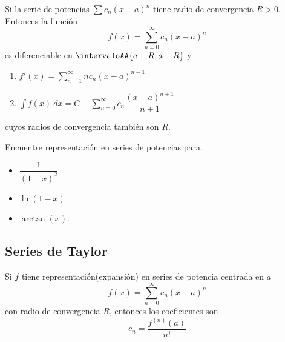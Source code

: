 \begin{frame}
  \begin{thm}
    Si la serie de potencias $\sum c_n(x-a)^n$ tiene radio de convergencia $R>0$. Entonces la función 
    $$f(x)=\sum_{n=0}^{\infty} c_n(x-a)^n$$ es diferenciable en $\intervaloAA{a-R,a+R}$ y
    \begin{enumerate}
      \item $f'(x)=\displaystyle\sum_{n=1}^{\infty}nc_n(x-a)^{n-1}$\\
      \item $\int f(x)\ dx = C + \displaystyle\sum_{n=0}^{\infty}c_n\dfrac{(x-a)^{n+1}}{n+1}$\\
    \end{enumerate} 
    cuyos radios de convergencia también son $R$.
  \end{thm}
\end{frame}

\begin{frame}
  \begin{egs}
    Encuentre representación en series de potencias para.\\[0.5cm]
    \begin{itemize}[<+->]
      \item $\dfrac{1}{(1-x)^2}$\\
      \vspace{0.25cm}
      \item $\ln(1-x)$\\
      \vspace{0.25cm}
      \item $\arctan(x)$.
    \end{itemize}
  \end{egs}
\end{frame}

\subsection{Series de Taylor}
\begin{frame}
\subsectionpage
\end{frame}


\begin{frame}
  \vspace{-0.5cm}
  \begin{thm}
  Si $f$ tiene representación(expansión) en series de potencia centrada en $a$
  $$f(x)=\sum_{n=0}^{\infty}c_n(x-a)^n$$
  con radio de convergencia $R$, entonces los coeficientes son
  $$c_n=\dfrac{f^{(n)}(a)}{n!}$$
  \end{thm}
\end{frame}

